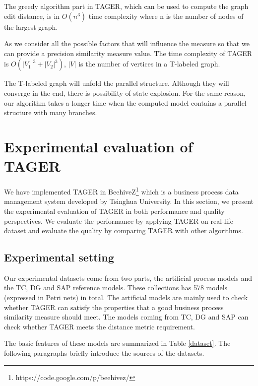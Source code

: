 \documentclass{llncs}
\begin{document}
The greedy algorithm part in TAGER, which can be used to compute the graph edit distance, is in $O(n^{3})$ time complexity where n is the number of nodes of the largest graph.
  
As we consider all the possible factors that will influence the measure so that we can provide a precision similarity measure value. The time complexity of TAGER is $O(|V_{1}|^{3}+|V_{2}|^{3})$, $|V|$ is the number of vertices in a T-labeled graph.

The T-labeled graph will unfold the parallel structure. Although they will converge in the end, there is possibility of state explosion. For the same reason, our algorithm takes a longer time when the computed model contains a parallel structure with many branches.

\section{Experimental evaluation of TAGER}\label{Evaluation}
We have implemented TAGER in BeehiveZ\footnote{https://code.google.com/p/beehivez/} which is a business process data management system developed by Tsinghua University. In this section, we present the experimental evaluation of TAGER in both performance and quality perspectives.
We evaluate the performance by applying TAGER on real-life dataset and evaluate the quality by comparing TAGER with other algorithms.

\subsection{Experimental setting}\label{Experimental Setup}
Our experimental datasets come from two parts, the artificial process models and the TC, DG and SAP reference models. These collections has 578 models (expressed in Petri nets) in total. The artificial models are mainly used to check whether TAGER can satisfy the properties that a good business process similarity measure should meet. The models coming from TC, DG and SAP can check whether TAGER meets the distance metric requirement.

The basic features of these models are summarized in Table \ref{dataset}. The following paragraphs briefly introduce the sources of the datasets. 
\end{document}
